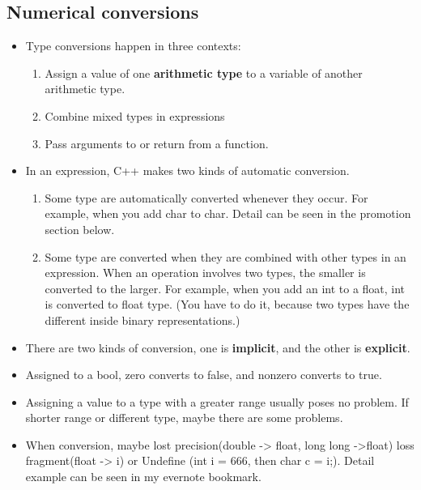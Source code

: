 \documentclass[a4paper,12pt,twoside]{book}
\begin{document}
\subsection{Numerical conversions}

\begin{itemize}
	\item Type conversions happen in three contexts:
	\begin{enumerate}
		\item Assign a value of one \textbf{arithmetic type} to a variable of another arithmetic type.
		\item Combine mixed types in expressions
		\item Pass arguments to or return from a function.
	\end{enumerate}
	
	\item In an expression, C++ makes two kinds of automatic conversion.
	\begin{enumerate}
		\item Some type are automatically converted whenever they occur. For example, when you add char to char. Detail can be seen in the promotion section below.
		
		\item Some type are converted when they are combined with other types in an expression. When an operation involves two types, the smaller is converted to the larger. For example, when you add an int to a float, int is converted to float type. (You have to do it, because two types have the different inside binary representations.)
	\end{enumerate}
	
	\item There are two kinds of conversion, one is \textbf{implicit}, and the other is \textbf{explicit}.
	
	\item Assigned to a bool, zero converts to false, and nonzero converts to true.
	
	\item Assigning a value to a type with a greater range usually poses no problem. If shorter range or different type, maybe there are some problems.
	
	\item When conversion, maybe lost precision(double -> float, long long ->float) loss fragment(float -> i) or Undefine (int i = 666, then char c = i;). Detail example can be seen in my evernote bookmark.
	

\end{itemize}
\end{document}
